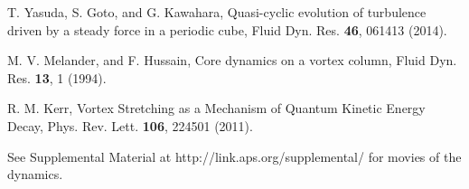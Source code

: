 \documentclass[aps,onecolumn,pra,longbibliography]{revtex4}
\begin{document}
\begin{thebibliography}{99}
		T. Yasuda, S. Goto, and G. Kawahara,
		Quasi-cyclic evolution of turbulence driven by a steady force in a periodic cube,
		Fluid Dyn. Res. \textbf{46}, 061413 (2014).

		M. V. Melander, and F. Hussain,
		Core dynamics on a vortex column,
		Fluid Dyn. Res. \textbf{13}, 1 (1994).

		R. M. Kerr,
		Vortex Stretching as a Mechanism of Quantum Kinetic Energy Decay,
		Phys. Rev. Lett. \textbf{106}, 224501 (2011).


		See Supplemental Material at http://link.aps.org/supplemental/
		for movies of the dynamics.

	\end{thebibliography}
\end{document}
